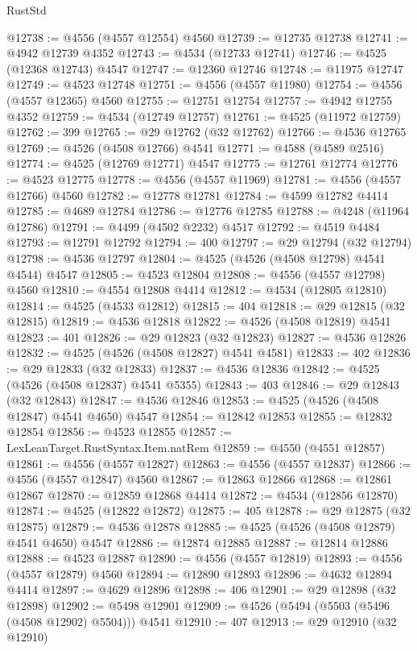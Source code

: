 \begin{lexlean}{RustStd}
\begin{coremodule}
@12738 := @4556 (@4557 @12554) @4560
@12739 := @12735 @12738
@12741 := @4942 @12739 @4352
@12743 := @4534 (@12733 @12741)
@12746 := @4525 (@12368 @12743) @4547
@12747 := @12360 @12746
@12748 := @11975 @12747
@12749 := @4523 @12748
@12751 := @4556 (@4557 @11980)
@12754 := @4556 (@4557 @12365) @4560
@12755 := @12751 @12754
@12757 := @4942 @12755 @4352
@12759 := @4534 (@12749 @12757)
@12761 := @4525 (@11972 @12759)
@12762 := 399
@12765 := @29 @12762 (@32 @12762)
@12766 := @4536 @12765
@12769 := @4526 (@4508 @12766) @4541
@12771 := @4588 (@4589 @2516)
@12774 := @4525 (@12769 @12771) @4547
@12775 := @12761 @12774
@12776 := @4523 @12775
@12778 := @4556 (@4557 @11969)
@12781 := @4556 (@4557 @12766) @4560
@12782 := @12778 @12781
@12784 := @4599 @12782 @4414
@12785 := @4689 @12784
@12786 := @12776 @12785
@12788 := @4248 (@11964 @12786)
@12791 := @4499 (@4502 @2232) @4517
@12792 := @4519 @4484
@12793 := @12791 @12792
@12794 := 400
@12797 := @29 @12794 (@32 @12794)
@12798 := @4536 @12797
@12804 := @4525 (@4526 (@4508 @12798) @4541 @4544) @4547
@12805 := @4523 @12804
@12808 := @4556 (@4557 @12798) @4560
@12810 := @4554 @12808 @4414
@12812 := @4534 (@12805 @12810)
@12814 := @4525 (@4533 @12812)
@12815 := 404
@12818 := @29 @12815 (@32 @12815)
@12819 := @4536 @12818
@12822 := @4526 (@4508 @12819) @4541
@12823 := 401
@12826 := @29 @12823 (@32 @12823)
@12827 := @4536 @12826
@12832 := @4525 (@4526 (@4508 @12827) @4541 @4581)
@12833 := 402
@12836 := @29 @12833 (@32 @12833)
@12837 := @4536 @12836
@12842 := @4525 (@4526 (@4508 @12837) @4541 @5355)
@12843 := 403
@12846 := @29 @12843 (@32 @12843)
@12847 := @4536 @12846
@12853 := @4525 (@4526 (@4508 @12847) @4541 @4650) @4547
@12854 := @12842 @12853
@12855 := @12832 @12854
@12856 := @4523 @12855
@12857 := LexLeanTarget.RustSyntax.Item.natRem
@12859 := @4550 (@4551 @12857)
@12861 := @4556 (@4557 @12827)
@12863 := @4556 (@4557 @12837)
@12866 := @4556 (@4557 @12847) @4560
@12867 := @12863 @12866
@12868 := @12861 @12867
@12870 := @12859 @12868 @4414
@12872 := @4534 (@12856 @12870)
@12874 := @4525 (@12822 @12872)
@12875 := 405
@12878 := @29 @12875 (@32 @12875)
@12879 := @4536 @12878
@12885 := @4525 (@4526 (@4508 @12879) @4541 @4650) @4547
@12886 := @12874 @12885
@12887 := @12814 @12886
@12888 := @4523 @12887
@12890 := @4556 (@4557 @12819)
@12893 := @4556 (@4557 @12879) @4560
@12894 := @12890 @12893
@12896 := @4632 @12894 @4414
@12897 := @4629 @12896
@12898 := 406
@12901 := @29 @12898 (@32 @12898)
@12902 := @5498 @12901
@12909 := @4526 (@5494 (@5503 (@5496 (@4508 @12902) @5504))) @4541
@12910 := 407
@12913 := @29 @12910 (@32 @12910)

\end{coremodule}
\end{lexlean}
